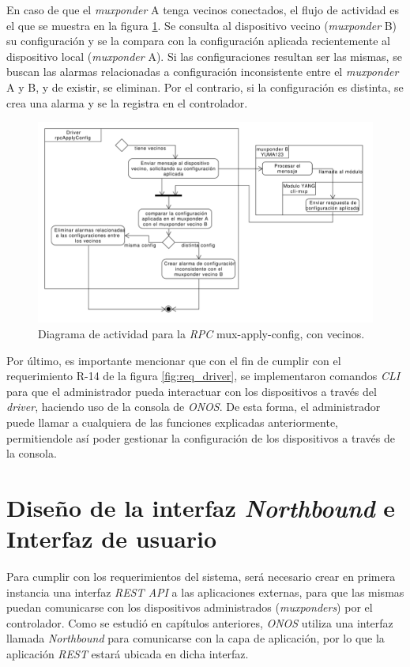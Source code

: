   En caso de que el \textit{muxponder} A tenga vecinos conectados, el flujo de actividad es el que se muestra en la figura \ref{fig:actividad_driver_rpc_con_vecinos}. Se consulta al dispositivo vecino (\textit{muxponder} B) su configuración y se la compara con la configuración aplicada recientemente al dispositivo local (\textit{muxponder} A). Si las configuraciones resultan ser las mismas, se buscan las alarmas relacionadas a configuración inconsistente entre el \textit{muxponder} A y B, y de existir, se eliminan. Por el contrario, si la configuración es distinta, se crea una alarma y se la registra en el controlador.

  \begin{figure}[H]
    \centering
    \includegraphics[scale=0.44]{Figures/actividad_driver_rpc_con_vecinos.pdf}
    \caption{Diagrama de actividad para la \textit{RPC} mux-apply-config, con vecinos.}
    \label{fig:actividad_driver_rpc_con_vecinos}
  \end{figure}


  Por último, es importante mencionar que con el fin de cumplir con el requerimiento R-14 de la figura \ref{fig:req_driver}, se implementaron comandos \textit{CLI} para que el administrador pueda interactuar con los dispositivos a través del \textit{driver}, haciendo uso de la consola de \textit{ONOS}. De esta forma, el administrador puede llamar a cualquiera de las funciones explicadas anteriormente, permitiendole así poder gestionar la configuración de los dispositivos a través de la consola.

  \section{Diseño de la interfaz \textit{Northbound} e Interfaz de usuario}
  Para cumplir con los requerimientos del sistema, será necesario crear en primera instancia una interfaz \textit{REST API} a las aplicaciones externas, para que las mismas puedan comunicarse con los dispositivos administrados (\textit{muxponders}) por el controlador. Como se estudió en capítulos anteriores, \textit{ONOS} utiliza una interfaz llamada \textit{Northbound} para comunicarse con la capa de aplicación, por lo que la aplicación \textit{REST} estará ubicada en dicha interfaz. 

